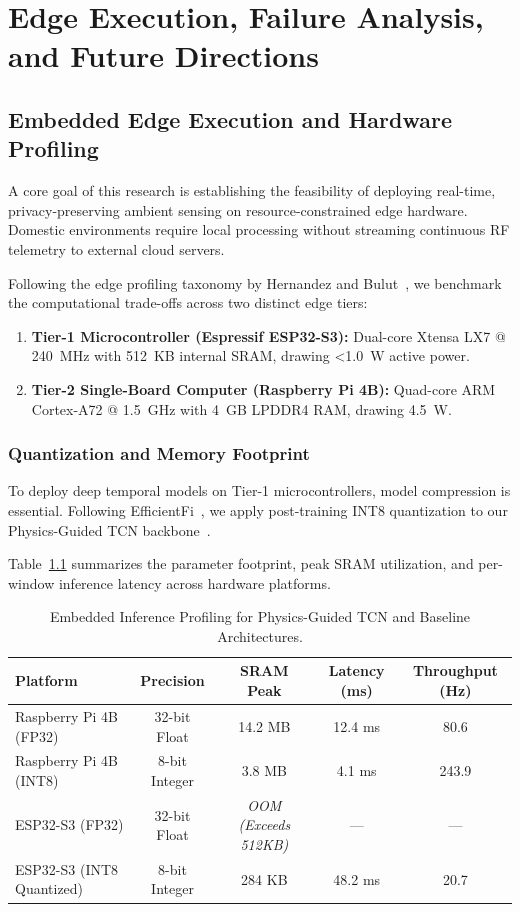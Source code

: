 \chapter{Edge Execution, Failure Analysis, and Future Directions}

\section{Embedded Edge Execution and Hardware Profiling}
A core goal of this research is establishing the feasibility of deploying real-time, privacy-preserving ambient sensing on resource-constrained edge hardware. Domestic environments require local processing without streaming continuous RF telemetry to external cloud servers.

Following the edge profiling taxonomy by Hernandez and Bulut~\cite{hernandez2024wifi}, we benchmark the computational trade-offs across two distinct edge tiers:
\begin{enumerate}
    \item \textbf{Tier-1 Microcontroller (Espressif ESP32-S3):} Dual-core Xtensa LX7 @ 240~MHz with 512~KB internal SRAM, drawing <1.0~W active power.
    \item \textbf{Tier-2 Single-Board Computer (Raspberry Pi 4B):} Quad-core ARM Cortex-A72 @ 1.5~GHz with 4~GB LPDDR4 RAM, drawing 4.5~W.
\end{enumerate}

\subsection{Quantization and Memory Footprint}
To deploy deep temporal models on Tier-1 microcontrollers, model compression is essential. Following EfficientFi~\cite{author2022efficientfi}, we apply post-training INT8 quantization to our Physics-Guided TCN backbone~\cite{physics2026physics}.

Table~\ref{tab:edge_profiling} summarizes the parameter footprint, peak SRAM utilization, and per-window inference latency across hardware platforms.

\begin{table}[ht]
\centering
\caption{Embedded Inference Profiling for Physics-Guided TCN and Baseline Architectures.}
\label{tab:edge_profiling}
\begin{tabular}{lcccc}
\hline
\textbf{Platform} & \textbf{Precision} & \textbf{SRAM Peak} & \textbf{Latency (ms)} & \textbf{Throughput (Hz)} \\
\hline
Raspberry Pi 4B (FP32) & 32-bit Float & 14.2 MB & 12.4 ms & 80.6 \\
Raspberry Pi 4B (INT8) & 8-bit Integer & 3.8 MB & 4.1 ms & 243.9 \\
ESP32-S3 (FP32) & 32-bit Float & \textit{OOM (Exceeds 512KB)} & --- & --- \\
ESP32-S3 (INT8 Quantized) & 8-bit Integer & 284 KB & 48.2 ms & 20.7 \\
\hline
\end{tabular}
\end{table}

